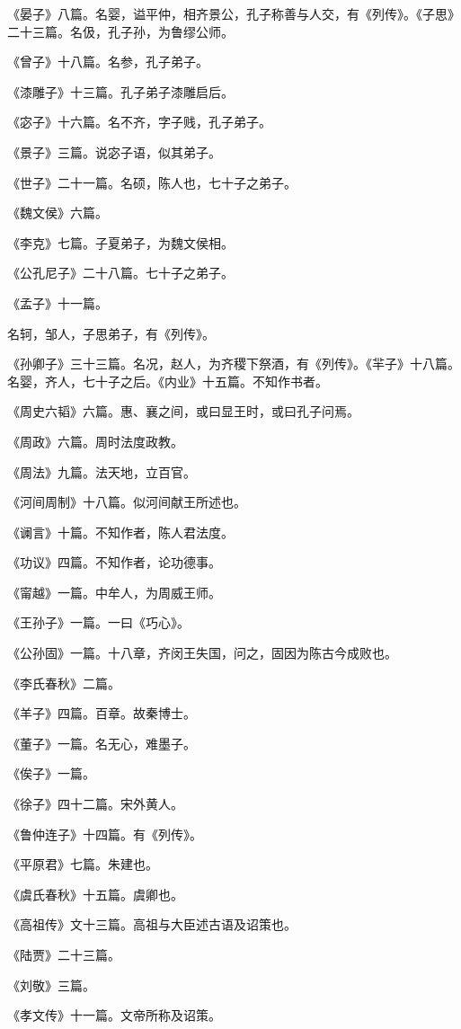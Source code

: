 \documentclass[]{article}
\begin{document}
《晏子》八篇。名婴，谥平仲，相齐景公，孔子称善与人交，有《列传》。《子思》二十三篇。名伋，孔子孙，为鲁缪公师。

《曾子》十八篇。名参，孔子弟子。

《漆雕子》十三篇。孔子弟子漆雕启后。

《宓子》十六篇。名不齐，字子贱，孔子弟子。

《景子》三篇。说宓子语，似其弟子。

《世子》二十一篇。名硕，陈人也，七十子之弟子。

《魏文侯》六篇。

《李克》七篇。子夏弟子，为魏文侯相。

《公孔尼子》二十八篇。七十子之弟子。

《孟子》十一篇。

名轲，邹人，子思弟子，有《列传》。

《孙卿子》三十三篇。名况，赵人，为齐稷下祭酒，有《列传》。《羋子》十八篇。名婴，齐人，七十子之后。《内业》十五篇。不知作书者。

《周史六韬》六篇。惠、襄之间，或曰显王时，或曰孔子问焉。

《周政》六篇。周时法度政教。

《周法》九篇。法天地，立百官。

《河间周制》十八篇。似河间献王所述也。

《谰言》十篇。不知作者，陈人君法度。

《功议》四篇。不知作者，论功德事。

《甯越》一篇。中牟人，为周威王师。

《王孙子》一篇。一曰《巧心》。

《公孙固》一篇。十八章，齐闵王失国，问之，固因为陈古今成败也。

《李氏春秋》二篇。

《羊子》四篇。百章。故秦博士。

《董子》一篇。名无心，难墨子。

《俟子》一篇。

《徐子》四十二篇。宋外黄人。

《鲁仲连子》十四篇。有《列传》。

《平原君》七篇。朱建也。

《虞氏春秋》十五篇。虞卿也。

《高祖传》文十三篇。高祖与大臣述古语及诏策也。

《陆贾》二十三篇。

《刘敬》三篇。

《孝文传》十一篇。文帝所称及诏策。
\end{document}
